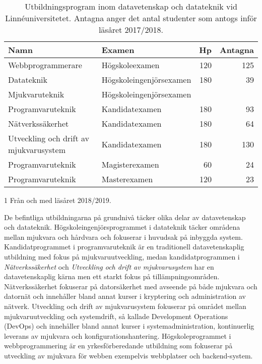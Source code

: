 \begin{table}
\centering
\caption{Utbildningsprogram inom datavetenskap och datateknik vid Linnéuniversitetet. Antagna anger det antal studenter som antogs inför läsåret 2017/2018.\label{tab:dvprogram}}
\begin{threeparttable}
\begin{tabular}{p{5cm}lrr}
\toprule
\textbf{\textsf{Namn}} & \textbf{\textsf{Examen}} & \textbf{\textsf{Hp}} & \textbf{\textsf{Antagna}}\tabularnewline
\midrule
Webbprogrammerare & Högskoleexamen & 120 & 125\tabularnewline
Datateknik & Högskoleingenjörsexamen & 180 & 39\tabularnewline
Mjukvaruteknik\tnote{1} & Högskoleingenjörsexamen & & \tabularnewline
Programvaruteknik & Kandidatexamen & 180 & 93\tabularnewline
Nätverkssäkerhet & Kandidatexamen & 180 & 64\tabularnewline
Utveckling och drift av mjukvarusystem & Kandidatexamen & 180 & 130\tabularnewline
Programvaruteknik & Magisterexamen & 60 & 24\tabularnewline
Programvaruteknik & Masterexamen & 120 & 23\tabularnewline
\bottomrule
\end{tabular}
\begin{tablenotes}
\item[1] Från och med läsåret 2018/2019.
\end{tablenotes}\end{threeparttable}
\end{table}

De befintliga utbildningarna på grundnivå täcker olika delar av datavetenskap och datateknik. Högskoleingenjörsprogrammet i datateknik täcker områdena mellan mjukvara och hårdvara och fokuserar i huvudsak på inbyggda system. Kandidatprogrammet i programvaruteknik är en traditionell datavetenskaplig utbildning med fokus på mjukvaruutveckling, medan kandidatprogrammen i \emph{Nätverkssäkerhet} och \emph{Utveckling och drift av mjukvarusystem} har en datavetenskaplig kärna men ett starkt fokus på tillämpningsområden. Nätverkssäkerhet fokuserar på datorsäkerhet med avseende på både mjukvara och datornät och innehåller bland annat kurser i kryptering och administration av nätverk. Utveckling och drift av mjukvarusystem fokuserar på området mellan mjukvaruutveckling och systemdrift, så kallade Development Operations (DevOps) och innehåller bland annat kurser i systemadministration, kontinuerlig leverans av mjukvara och konfigurationshantering. Högskoleprogrammet i webbprogrammering är en yrkesförberedande utbildning som fokuserar på utveckling av mjukvara för webben exempelvis webbplatser och backend-system.

